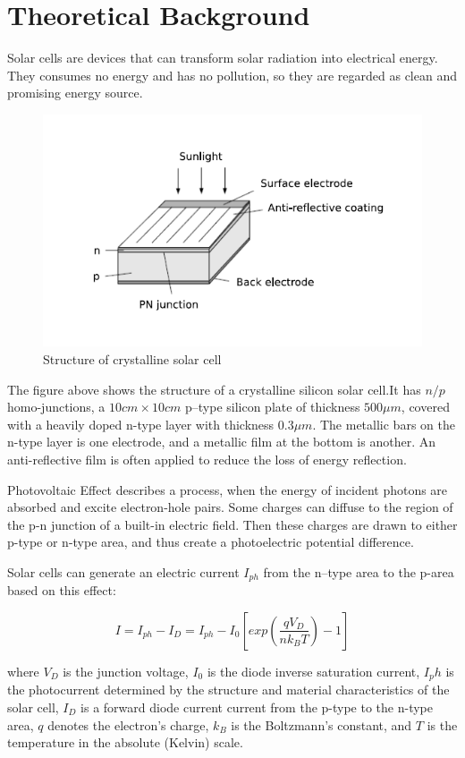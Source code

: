 \documentclass[12pt, a4paper]{article}
\begin{document}
\section{Theoretical Background}
Solar cells are devices that can transform solar radiation into electrical energy. They consumes no 
energy and has no pollution, so they are regarded as clean and promising energy source.

\begin{figure}[H]
	\centering
	\includegraphics[scale = 0.6]{fig1.png}
	\caption{Structure of crystalline solar cell}
\end{figure}

The figure above shows the structure of a crystalline silicon solar cell.It has 
$n/p$ homo-junctions, a $10 cm \times 10 cm$ p–type silicon plate of thickness $500 \mu m$,
covered with a heavily doped n-type layer with thickness $0.3 \mu m$. The metallic bars on
the n-type layer is one electrode, and a metallic film at the bottom is another. An anti-reflective
film is often applied to reduce the loss of energy reflection.

Photovoltaic Effect describes a process, when the energy of incident photons are absorbed and 
excite electron-hole pairs. Some charges can diffuse to the region of the p-n junction of a 
built-in electric field. Then these charges are drawn to either p-type or n-type area, and thus 
create a photoelectric potential difference.

Solar cells can generate an electric current $I_{ph}$ from the n–type area to the 
p-area based on this effect:

$$
I = I_{ph} - I_{D} = I_{ph} - I_0\left[ exp\left( \frac{qV_D}{nk_BT} \right) -1 \right]
$$

where $V_D$ is the junction voltage, $I_0$ is the diode inverse saturation current, $I_ph$ is the
photocurrent determined by the structure and material characteristics of the solar cell, $I_D$ is 
a forward diode current current from the p-type to the n-type area, $q$ denotes the electron’s charge, $k_B$ is the
Boltzmann’s constant, and $T$ is the temperature in the absolute (Kelvin) scale.
\end{document}
